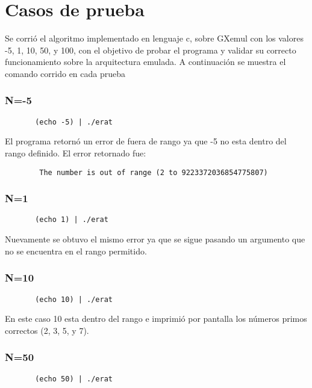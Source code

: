 \documentclass[a4paper,10pt]{article}
\begin{document}
\section{Casos de prueba}

Se corrió el algoritmo implementado en lenguaje c, sobre GXemul con los valores -5, 1, 10, 50, y 100, con el objetivo de probar el programa y validar su correcto funcionamiento sobre la arquitectura emulada. A continuación se muestra el comando corrido en cada prueba

    \subsubsection{N=-5}
    \begin{verbatim}
       (echo -5) | ./erat 
    \end{verbatim}
    
    El programa retornó un error de fuera de rango ya que -5 no esta dentro del rango definido. El error retornado fue:\\
    \begin{verbatim}
        The number is out of range (2 to 9223372036854775807)
    \end{verbatim}
    
    \subsubsection{N=1}
    \begin{verbatim}
       (echo 1) | ./erat 
    \end{verbatim}

    Nuevamente se obtuvo el mismo error ya que se sigue pasando un argumento que no se encuentra en el rango permitido.\\
    
    \subsubsection{N=10}
    \begin{verbatim}
       (echo 10) | ./erat 
    \end{verbatim}
    
    En este caso 10 esta dentro del rango e imprimió por pantalla los números primos correctos (2, 3, 5, y 7).\\
    
   \subsubsection{N=50}
    \begin{verbatim}
       (echo 50) | ./erat 
    \end{verbatim}
    
\end{document}
